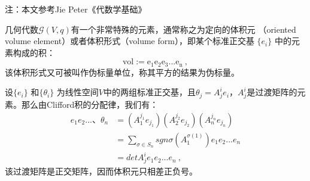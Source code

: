 
注：本文参考Jie Peter《代数学基础》

几何代数$\mathcal G(V,q)$有一个非常特殊的元素，通常称之为定向的体积元
（oriented volume element）或者体积形式（volume form），即某个标准正交基 $\{e_i\}$ 中的元素构成的积：
$$\mathrm {vol:=e_1e_2e_3...e_n}~,$$
该体积形式又可被叫作伪标量单位，称其平方的结果为伪标量。

设$\{e_i\}$ 和$\{\theta_i\}$ 为线性空间$V$中的两组标准正交基，且$\theta_j=A^i_j e_i$，$A^i_j$是过渡矩阵的元素。那么由Clifford积的分配律，我们有：
\begin{equation}
\begin{aligned}
e_1e_2...、\theta_n&=(A^{j_1}_1 e_{j_1})(A^{j_2}_2 e_{j_2})(A^{j_n}_n e_{j_n})\\
&=\sum_{\sigma\in S_n} sgn\sigma(A^{\sigma (1)}_1)e_1e_2...e_n\\
&=det A^i_je_1e_2...e_n~,
\end{aligned}
\end{equation}
该过渡矩阵是正交矩阵，因而体积元只相差正负号。